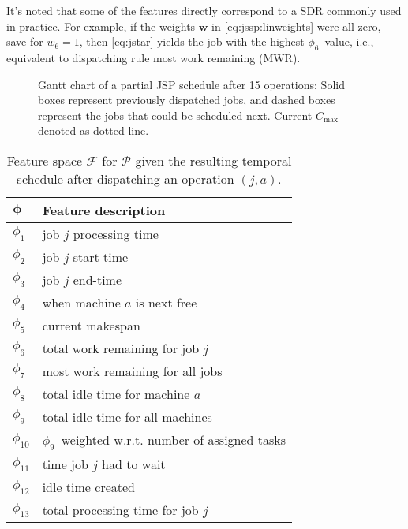 \documentclass[graybox]{svmult}
\renewcommand{\vec}[1]{\mathbf{#1}}
\newcommand{\vphi}{{\boldsymbol{\phi}}}
\newcommand{\phiproc}{$\phi_1$}
\newcommand{\phistartTime}{$\phi_2$}
\newcommand{\phiendTime}{$\phi_3$}
\newcommand{\phimacFree}{$\phi_4$}
\newcommand{\phimakespan}{$\phi_5$}
\newcommand{\phiwrmJob}{$\phi_6$}
\newcommand{\phiwrmMWR}{$\phi_7$}
\newcommand{\phislots}{$\phi_{8}$}
\newcommand{\phislotsTotal}{$\phi_{9}$}
\newcommand{\phislotsTotalperOp}{$\phi_{10}$}
\newcommand{\phiwait}{$\phi_{11}$}
\newcommand{\phislotCreated}{$\phi_{12}$}
\newcommand{\phitotProc}{$\phi_{13}$}
\begin{document}
It's noted that some of the features directly correspond to a SDR commonly used 
in practice. For example, if the weights $\vec{w}$ in \cref{eq:jssp:linweights} 
were all zero, save for $w_6=1$, then \cref{eq:jstar} yields the job with the 
highest \phiwrmJob\ value, i.e., equivalent  to dispatching rule most work 
remaining (MWR).

\begin{figure}[p]\centering 
    \caption[Gantt chart of a partial JSP schedule]{Gantt chart of a partial 
    JSP 
        schedule after 15 operations: Solid boxes represent previously 
        dispatched jobs, 
        and dashed boxes represent the jobs that could be scheduled next. 
        Current 
        $C_{\max}$ denoted as dotted line.}
    \label{fig:jssp:example}
\end{figure}

\begin{table}[p]
\caption{Feature space $\mathcal{F}$ for $\mathcal{P}$ given the resulting 
temporal schedule after dispatching an operation $(j,a)$.  }
\label{tbl:jssp:feat}

\centering
\begin{tabular}{ll} %
\toprule
$\vphi$ & Feature description \\
\midrule
\phiproc & job $j$ processing time \\
\phistartTime & job $j$ start-time \\
\phiendTime & job $j$ end-time\\
\phimacFree & when machine $a$ is next free \\
\phimakespan & current makespan \\   
\phiwrmJob & total work remaining for job $j$ \\
\phiwrmMWR & most work remaining for all jobs\\
\phislots & total idle time for machine $a$ \\
\phislotsTotal & total idle time for all machines \\
\phislotsTotalperOp & \phislotsTotal\ weighted w.r.t. number of assigned tasks\\
\phiwait & time job $j$ had to wait \\
\phislotCreated & idle time created \\      
\phitotProc & total processing time for job $j$ \\
\bottomrule
\end{tabular}
\end{table}
\end{document}
